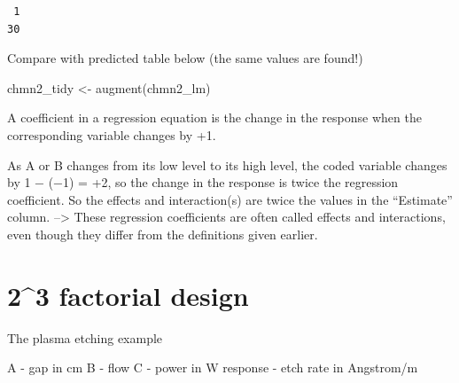 \documentclass[
]{book}
\newenvironment{Shaded}{\begin{snugshade}}{\end{snugshade}}
\newcommand{\CommentTok}[1]{\textcolor[rgb]{0.56,0.35,0.01}{\textit{#1}}}
\newcommand{\FunctionTok}[1]{\textcolor[rgb]{0.00,0.00,0.00}{#1}}
\newcommand{\NormalTok}[1]{#1}
\newcommand{\OtherTok}[1]{\textcolor[rgb]{0.56,0.35,0.01}{#1}}
\newcommand{\SpecialCharTok}[1]{\textcolor[rgb]{0.00,0.00,0.00}{#1}}
\newcommand{\StringTok}[1]{\textcolor[rgb]{0.31,0.60,0.02}{#1}}
\begin{document}
\begin{verbatim}
 1 
30 
\end{verbatim}

Compare with predicted table below (the same values are found!)

\begin{Shaded}
\begin{Highlighting}[]
\NormalTok{chmn2\_tidy }\OtherTok{\textless{}{-}} \FunctionTok{augment}\NormalTok{(chmn2\_lm)}
\end{Highlighting}
\end{Shaded}

A coefficient in a regression equation is the change in the response when the corresponding variable changes by +1.

As A or B changes from its low level to its high level, the coded variable changes by 1 − (−1) = +2, so the change in the response is twice the regression coefficient.
So the effects and interaction(s) are twice the values in the ``Estimate'' column.
--\textgreater{} These regression coefficients are often called effects and interactions, even though they differ from the definitions given earlier.

\hypertarget{factorial-design-1}{%
\section{2\^{}3 factorial design}\label{factorial-design-1}}

The plasma etching example

A - gap in cm
B - flow
C - power in W
response - etch rate in Angstrom/m

\begin{Shaded}
\end{Shaded}
\end{document}
